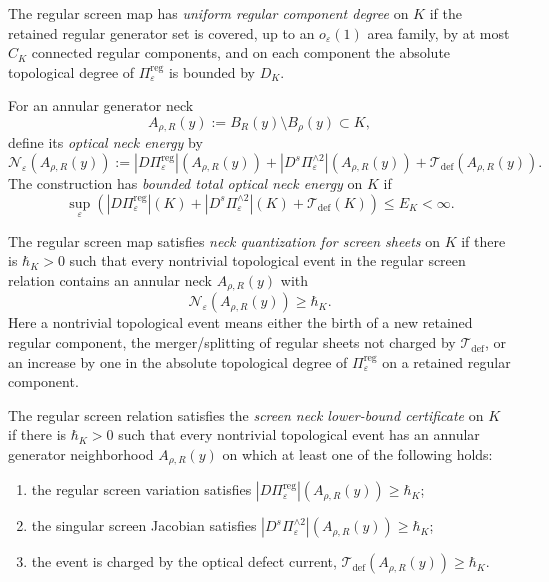 \begin{definition}\label{def:UniformRegularComponentDegree}
The regular screen map has \emph{uniform regular component degree} on $K$ if the retained regular generator set is covered, up to an $o_\varepsilon(1)$ area family, by at most $C_K$ connected regular components, and on each component the absolute topological degree of $\Pi_{\varepsilon}^{\mathrm{reg}}$ is bounded by $D_K$.
\end{definition}

\begin{definition}\label{def:OpticalNeckEnergy}
For an annular generator neck
\[
    A_{\rho,R}(y):=B_R(y)\setminus B_\rho(y)
    \subset K,
\]
define its \emph{optical neck energy} by
\[
    \mathcal N_\varepsilon(A_{\rho,R}(y))
    :=
    |D\Pi_\varepsilon^{\mathrm{reg}}|(A_{\rho,R}(y))
    +
    |D^s\Pi_\varepsilon^{\wedge 2}|(A_{\rho,R}(y))
    +
    \mathcal T_{\mathrm{def}}(A_{\rho,R}(y)).
\]
The construction has \emph{bounded total optical neck energy} on $K$ if
\[
    \sup_\varepsilon
    \left(
        |D\Pi_\varepsilon^{\mathrm{reg}}|(K)
        +
        |D^s\Pi_\varepsilon^{\wedge 2}|(K)
        +
        \mathcal T_{\mathrm{def}}(K)
    \right)
    \le E_K<\infty .
\]
\end{definition}

\begin{definition}\label{def:NeckQuantizationScreenSheets}
The regular screen map satisfies \emph{neck quantization for screen sheets} on $K$ if there is $\hbar_K>0$ such that every nontrivial topological event in the regular screen relation contains an annular neck $A_{\rho,R}(y)$ with
\[
    \mathcal N_\varepsilon(A_{\rho,R}(y))\ge\hbar_K.
\]
Here a nontrivial topological event means either the birth of a new retained regular component, the merger/splitting of regular sheets not charged by $\mathcal T_{\mathrm{def}}$, or an increase by one in the absolute topological degree of $\Pi_\varepsilon^{\mathrm{reg}}$ on a retained regular component.
\end{definition}

\begin{definition}\label{def:ScreenNeckLowerBoundCertificate}
The regular screen relation satisfies the \emph{screen neck lower-bound certificate} on $K$ if there is $\hbar_K>0$ such that every nontrivial topological event has an annular generator neighborhood $A_{\rho,R}(y)$ on which at least one of the following holds:
\begin{enumerate}
    \item the regular screen variation satisfies $|D\Pi_\varepsilon^{\mathrm{reg}}|(A_{\rho,R}(y))\ge\hbar_K$;
    \item the singular screen Jacobian satisfies $|D^s\Pi_\varepsilon^{\wedge2}|(A_{\rho,R}(y))\ge\hbar_K$;
    \item the event is charged by the optical defect current, $\mathcal T_{\mathrm{def}}(A_{\rho,R}(y))\ge\hbar_K$.
\end{enumerate}
\end{definition}

